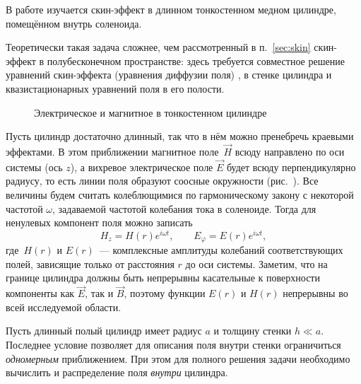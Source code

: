 


В работе изучается скин-эффект в длинном тонкостенном медном цилиндре,
помещённом внутрь соленоида.

Теоретически такая задача сложнее,
чем рассмотренный в п.~\ref{sec:skin} скин-эффект в полубесконечном пространстве:
здесь требуется совместное решение уравнений
скин-эффекта (уравнения диффузии поля) ,
 в стенке цилиндра и квазистационарных
уравнений поля в его полости.

\begin{wrapfigure}{o}{0.4\textwidth}
    \caption{Электрическое и магнитное в тонкостенном цилиндре}
\end{wrapfigure}
Пусть цилиндр достаточно длинный, так что в нём можно пренебречь
краевыми эффектами.
В этом приближении магнитное поле~$\vec{H}$ всюду направлено
по оси системы (ось $z$), а вихревое электрическое поле $\vec{E}$
будет всюду перпендикулярно радиусу, то есть линии поля образуют соосные окружности
(рис.~).
Все величины будем считать колеблющимися по гармоническому закону
с некоторой частотой $\omega$, задаваемой частотой колебания тока
в соленоиде. Тогда для ненулевых компонент поля можно записать
\[
H_z = H(r) e^{i\omega t},\qquad E_{\varphi} = E(r) e^{i\omega t},
\]
где~$H(r)$ и $E(r)$~--- комплексные амплитуды колебаний соответствующих полей,
зависящие только от расстояния $r$ до оси системы.
Заметим, что на границе цилиндра должны быть непрерывны касательные
к поверхности компоненты как $\vec{E}$, так и $\vec{B}$,
поэтому функции $E(r)$ и $H(r)$ непрерывны во всей исследуемой области.

Пусть длинный полый цилиндр имеет радиус $a$ и толщину стенки $h \ll a$.
Последнее условие позволяет для описания поля внутри стенки
ограничиться \emph{одномерным} приближением. При этом для полного
решения задачи необходимо вычислить и распределение поля \emph{внутри} цилиндра.


